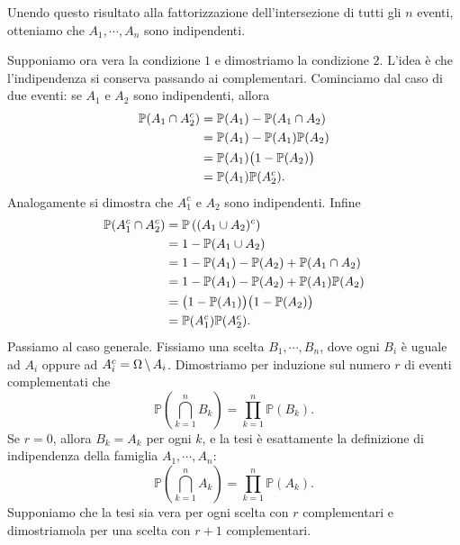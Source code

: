 \documentclass[a4paper]{article}
\begin{document}
\begin{snippetproof}{}
\begin{ffiproof}
        Unendo questo risultato alla fattorizzazione dell'intersezione di tutti gli \(n\) eventi, otteniamo che \(A_1,\cdots,A_n\) sono indipendenti.
    \item Supponiamo ora vera la condizione \(1\) e dimostriamo la condizione \(2\).
        L'idea è che l'indipendenza si conserva passando ai complementari.
        Cominciamo dal caso di due eventi: se \(A_1\) e \(A_2\) sono indipendenti, allora
        \begin{align*}
            \mathbb P(A_1 \cap A_2^c)
            &=
            \mathbb P(A_1)-\mathbb P(A_1\cap A_2) \\
            &=
            \mathbb P(A_1)-\mathbb P(A_1)\mathbb P(A_2) \\
            &=
            \mathbb P(A_1)\bigl(1-\mathbb P(A_2)\bigr) \\
            &=
            \mathbb P(A_1)\mathbb P(A_2^c).
        \end{align*}
        Analogamente si dimostra che \(A_1^c\) e \(A_2\) sono indipendenti.
        Infine
        \begin{align*}
            \mathbb P(A_1^c \cap A_2^c)
            &=
            \mathbb P\left((A_1 \cup A_2)^c\right) \\
            &=
            1-\mathbb P(A_1 \cup A_2) \\
            &=
            1-\mathbb P(A_1)-\mathbb P(A_2)+\mathbb P(A_1\cap A_2) \\
            &=
            1-\mathbb P(A_1)-\mathbb P(A_2)+\mathbb P(A_1)\mathbb P(A_2) \\
            &=
            \bigl(1-\mathbb P(A_1)\bigr)\bigl(1-\mathbb P(A_2)\bigr) \\
            &=
            \mathbb P(A_1^c)\mathbb P(A_2^c).
        \end{align*}
        Passiamo al caso generale.
        Fissiamo una scelta \(B_1,\cdots,B_n\), dove ogni \(B_i\) è uguale ad \(A_i\) oppure ad \(A_i^c=\Omega\,\backslash\, A_i\).
        Dimostriamo per induzione sul numero \(r\) di eventi complementati che
        \[
            \mathbb P\left(\bigcap_{k=1}^n B_k\right)
            =
            \prod_{k=1}^n \mathbb P(B_k).
        \]
        Se \(r=0\), allora \(B_k=A_k\) per ogni \(k\), e la tesi è esattamente la definizione di indipendenza della famiglia \(A_1,\cdots,A_n\):
        \[
            \mathbb P\left(\bigcap_{k=1}^n A_k\right)
            =
            \prod_{k=1}^n \mathbb P(A_k).
        \]
        Supponiamo che la tesi sia vera per ogni scelta con \(r\) complementari e dimostriamola per una scelta con \(r+1\) complementari.

\end{ffiproof}
\end{snippetproof}
\end{document}
